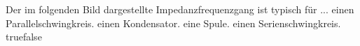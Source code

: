     {Der im folgenden Bild dargestellte Impedanzfrequenzgang ist typisch für ...}
    {einen Parallelschwingkreis.}
    {einen Kondensator.}
    {eine Spule.}
    {einen Serienschwingkreis.}
    {true}{false}